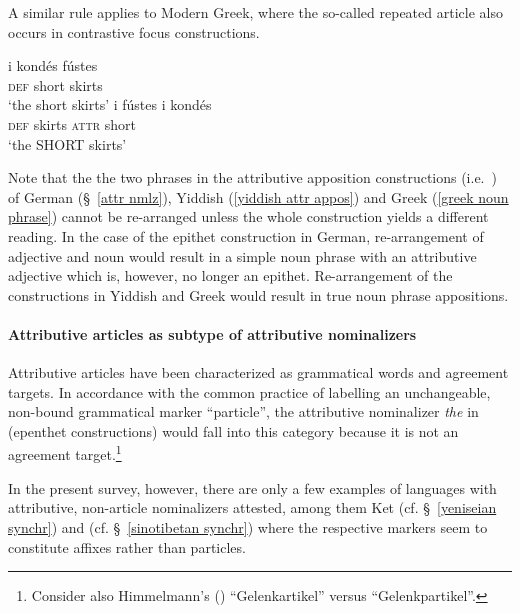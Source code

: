 A similar rule applies to Modern Greek, where the so-called repeated article also occurs in contrastive focus constructions. 
\begin{exe}
\ex
{} \label{greek noun phrase}
\begin{xlist}
\ex
\gll 	i kondés fústes\\
	\textsc{def} short skirts\\
\glt	‘the short skirts’
\ex 
\gll 	i fústes i kondés\\
	\textsc{def} skirts \textsc{attr} short\\
\glt	‘the SHORT skirts’
\end{xlist}
\end{exe}
Note that the the two phrases in the attributive apposition constructions (i.e.~) of German (\S~\ref{attr nmlz}), Yiddish (\ref{yiddish attr appos}) and Greek (\ref{greek noun phrase}) cannot be re-arranged unless the whole construction yields a different reading. In the case of the epithet construction in German, re-arrangement of adjective and noun would result in a simple noun phrase with an attributive adjective which is, however, no longer an epithet. Re-arrangement of the constructions in Yiddish and Greek would result in true noun phrase appositions.

\paragraph{Attributive articles as subtype of attributive nominalizers}
Attributive articles have been characterized as grammatical words and agreement targets. In accordance with the common practice of labelling an unchangeable, non-bound grammatical marker “particle”, the attributive nominalizer \textit{the} in  (epen\-thet constructions) would fall into this category because it is not an agreement target.\footnote{Consider also Himmelmann's (\citeyear{himmelmann1997}) “Gelenkartikel” versus “Gelenkpartikel”.}

In the present survey, however, there are only a few examples of languages with attributive, non-article nominalizers attested, among them Ket (cf. \S~\ref{yeniseian synchr}) and  (cf. \S~\ref{sinotibetan synchr}) where the respective markers seem to constitute affixes rather than particles.

